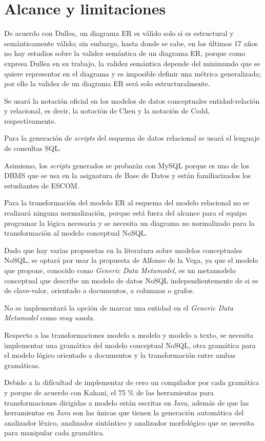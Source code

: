 \section{Alcance y limitaciones}\label{sec:alcance}
De acuerdo con Dullea\cite{dullea_analysis_2003}, un diagrama ER es válido solo si es estructural y semánticamente válido; sin embargo, hasta donde se sabe, en los últimos 17 años no hay estudios sobre la validez semántica de un diagrama ER, porque como expresa Dullea en su trabajo, la validez semántica depende del minimundo que se quiere representar en el diagrama y es imposible definir una métrica generalizada; por ello la validez de un diagrama ER será solo estructuralmente.


Se usará la notación oficial en los modelos de datos conceptuales entidad-relación y relacional, es decir, la notación de Chen y la notación de Codd, respectivamente.


Para la generación de \textit{scripts} del esquema de datos relacional se usará el lenguaje de consultas SQL.


Asimismo, los \textit{scripts} generados se probarán con MySQL porque es uno de los DBMS que se usa en la asignatura de Base de Datos y están familiarizados los estudiantes de ESCOM.


Para la transformación del modelo ER al esquema del modelo relacional no se realizará ninguna normalización, porque está fuera del alcance para el equipo programar la lógica necesaria y se necesita un diagrama no normalizado para la transformación al modelo conceptual NoSQL.


Dado que hay varias propuestas en la literatura sobre modelos conceptuales NoSQL, se optará por usar la propuesta de Alfonso de la Vega\cite{de_la_vega_mortadelo_2020}, ya que el modelo que propone, conocido como \textit{Generic Data Metamodel}, es un metamodelo conceptual que describe un modelo de datos NoSQL independientemente de si es de clave-valor, orientado a documentos, a columnas o grafos.

No se implementará la opción de marcar una entidad en el \textit{Generic Data Metamodel} como \textit{muy usada}.

Respecto a las transformaciones modelo a modelo y modelo a texto, se necesita implementar una gramática del modelo conceptual NoSQL, otra gramática para el modelo lógico orientado a documentos y la transformación entre ambas gramáticas. 


Debido a la difícultad de implementar de cero un compilador por cada gramática y porque de acuerdo con Kahani\cite{kahani_survey_2019}, el 75 \% de las herramientas para transformaciones dirigidas a modelo están escritas en Java, además de que las herramientas en Java son las únicas que tienen la generación automática del analizador léxico, analizador sintántico y analizador morfológico que se necesita para manipular cada gramática.


